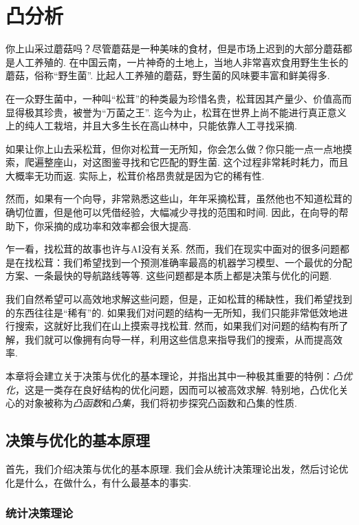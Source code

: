 \chapter{凸分析}\label{chap:convex-analysis}

你上山采过蘑菇吗？尽管蘑菇是一种美味的食材，但是市场上迟到的大部分蘑菇都是人工养殖的. 在中国云南，一片神奇的土地上，当地人非常喜欢食用野生生长的蘑菇，俗称“野生菌”. 比起人工养殖的蘑菇，野生菌的风味要丰富和鲜美得多. 

在一众野生菌中，一种叫“松茸”的种类最为珍惜名贵，松茸因其产量少、价值高而显得极其珍贵，被誉为“万菌之王”. 迄今为止，松茸在世界上尚不能进行真正意义上的纯人工栽培，并且大多生长在高山林中，只能依靠人工寻找采摘. 

如果让你上山去采松茸，但你对松茸一无所知，你会怎么做？你只能一点一点地摸索，爬遍整座山，对这图鉴寻找和它匹配的野生菌. 这个过程非常耗时耗力，而且大概率无功而返. 实际上，松茸价格昂贵就是因为它的稀有性. 

然而，如果有一个向导，非常熟悉这些山，年年采摘松茸，虽然他也不知道松茸的确切位置，但是他可以凭借经验，大幅减少寻找的范围和时间. 因此，在向导的帮助下，你采摘的成功率和效率都会很大提高. 

乍一看，找松茸的故事也许与AI没有关系. 然而，我们在现实中面对的很多问题都是在找松茸：我们希望找到一个预测准确率最高的机器学习模型、一个最优的分配方案、一条最快的导航路线等等. 这些问题都是本质上都是决策与优化的问题. 

我们自然希望可以高效地求解这些问题，但是，正如松茸的稀缺性，我们希望找到的东西往往是“稀有”的. 如果我们对问题的结构一无所知，我们只能非常低效地进行搜索，这就好比我们在山上摸索寻找松茸. 然而，如果我们对问题的结构有所了解，我们就可以像拥有向导一样，利用这些信息来指导我们的搜索，从而提高效率. 

本章将会建立关于决策与优化的基本理论，并指出其中一种极其重要的特例：\textit{凸优化}，这是一类存在良好结构的优化问题，因而可以被高效求解. 特别地，凸优化关心的对象被称为\textit{凸函数}和\textit{凸集}，我们将初步探究凸函数和凸集的性质. 

\section{决策与优化的基本原理}\label{sec:decision-optimization-principle}

首先，我们介绍决策与优化的基本原理. 我们会从统计决策理论出发，然后讨论优化是什么，在做什么，有什么最基本的事实. 

\subsection{统计决策理论}

